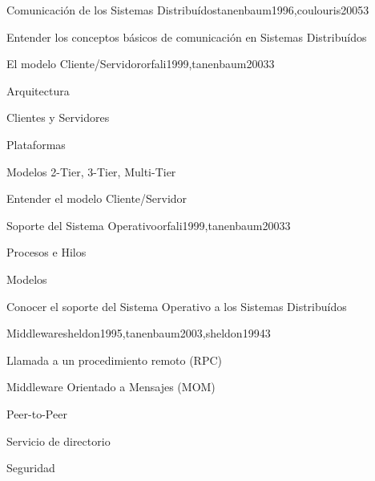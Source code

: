 \begin{syllabus}
\begin{unit}{Comunicación de los Sistemas Distribuídos}{tanenbaum1996,coulouris2005}{3}
   \begin{learningoutcomes}
      \item Entender los conceptos básicos de comunicación en Sistemas Distribuídos
   \end{learningoutcomes}
\end{unit}

\begin{unit}{El modelo Cliente/Servidor}{orfali1999,tanenbaum2003}{3}
   \begin{topics}
      \item Arquitectura
      \item Clientes y Servidores
      \item Plataformas
      \item Modelos 2-Tier, 3-Tier, Multi-Tier
   \end{topics}

   \begin{learningoutcomes}
      \item Entender el modelo Cliente/Servidor
   \end{learningoutcomes}
\end{unit}

\begin{unit}{Soporte del Sistema Operativo}{orfali1999,tanenbaum2003}{3}
   \begin{topics}
      \item Procesos e Hilos
      \item Modelos
   \end{topics}

   \begin{learningoutcomes}
      \item Conocer el soporte del Sistema Operativo a los Sistemas Distribuídos
   \end{learningoutcomes}
\end{unit}

\begin{unit}{Middleware}{sheldon1995,tanenbaum2003,sheldon1994}{3}
   \begin{topics}
      \item Llamada a un procedimiento remoto (RPC)
      \item Middleware Orientado a Mensajes (MOM)
      \item Peer-to-Peer
      \item Servicio de directorio
      \item Seguridad
   \end{topics}


\end{unit}
\end{syllabus}
